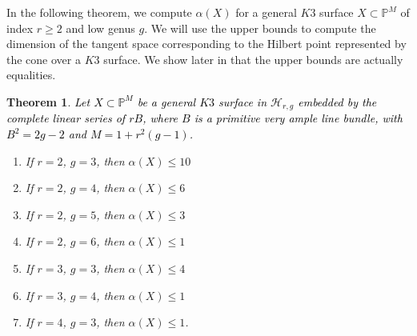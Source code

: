\documentclass[11pt,twoside]{amsart}
\theoremstyle{plain}
\numberwithin{equation}{section}
\newtheorem{theorem}{Theorem}[section]
\theoremstyle{definition}
\begin{document}
In the following theorem, we compute $\alpha(X)$ for a general $K3$ surface $X \subset \mathbb{P}^M$ of index $r \geq 2$ and low genus $g$. We will use the upper bounds to compute the dimension of the tangent space corresponding to the Hilbert point represented by the cone over a $K3$ surface. We show later in  that the upper bounds are actually equalities. 

\begin{theorem}\label{ZL for lower genus $K3$ surfaces}
\textcolor{black}{Let $X \subset \mathbb{P}^{M}$ be a general $K3$ surface in $\mathcal{H}_{r,g}$ embedded by the complete linear series of $rB$, where $B$ is a primitive very ample line bundle, with $B^2 = 2g-2$ and $M = 1+r^2(g-1)$.}
 
    \begin{enumerate}
        \item \label{2,3} If $r = 2$, $g = 3$, then $\alpha(X) \leq 10$ %
        \item \label{2,4} If $r = 2$, $g = 4$, then $\alpha(X) \leq 6$ 
        \item \label{2,5} If $r = 2$, $g = 5$, then $\alpha(X) \leq 3$ 
        \item \label{2,6} If $r = 2$, $g = 6$, then $\alpha(X) \leq 1$ 
        \item \label{3,3} If $r = 3$, $g = 3$, then $\alpha(X) \leq 4$
        \item \label{3,4} If $r = 3$, $g = 4$, then $\alpha(X) \leq 1$ 
        \item \label{4,3} If $r = 4$, $g = 3$, then $\alpha(X) \leq 1$.
        
       
        
    \end{enumerate}
    
\end{theorem}
\end{document}
